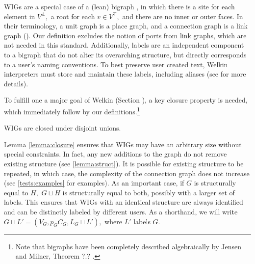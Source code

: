 \begin{itemize}
WIGs are a special case of a (lean) bigraph \cite{jensen-milner-bigraphs}, in which there is a site for each element in $V^{\bot},$ a root for each $v \in V^{\top},$ and there are no inner or outer faces. In their terminology, a unit graph is a place graph, and a connection graph is a link graph (\cite{jensen-milner-bigraphs}). Our definition excludes the notion of ports from link graphs, which are not needed in this standard. Additionally, labels are an independent component to a bigraph that do not alter its overarching structure, but directly corresponds to a user's naming conventions. To best preserve user created text, Welkin interpreters must store and maintain these labels, including aliases (see \label{req:labels} for more details).

To fulfill one a major goal of Welkin (Section \label{section:conformance}), a key closure property is needed, which immediately follow by our definitions.\footnote{Note that bigraphs have been completely described algebraically by Jensen and Milner, Theorem ?.? \cite{jensen-milner-bigraphs}. }

\begin{lemma}
  WIGs are closed under disjoint unions.
\end{lemma}
\label{lemma:closure}

Lemma \ref{lemma:closure} ensures that WIGs may have an arbitrary size without special constraints. In fact, any new additions to the graph do not remove existing structure (see \ref{lemma:struct}). It is possible for existing structure to be repeated, in which case, the complexity of the connection graph does not increase (see \ref{tests:examples} for examples). As an important case, if $G$ is structurally equal to $H,$ $G \sqcup H$ is structurally equal to both, possibly with a larger set of labels. This ensures that WIGs with an identical structure are always identified and can be distinctly labeled by different users. As a shorthand, we will write $G \sqcup L' = (V_{G}, p_{G} C_{G}, L_{G} \sqcup L'),$ where $L'$ labels $G.$



\end{itemize}
